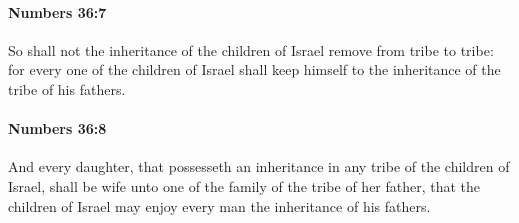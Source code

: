 		\paragraph{Numbers 36:7} %
			\label{NUMBERS-36-7}

			So shall not the inheritance of the children of Israel remove from tribe to tribe: for every one of the children of Israel shall keep himself to the inheritance of the tribe of his fathers.


		\paragraph{Numbers 36:8} %
			\label{NUMBERS-36-8}

			And every daughter, that possesseth an inheritance in any tribe of the children of Israel, shall be wife unto one of the family of the tribe of her father, that the children of Israel may enjoy every man the inheritance of his fathers.

